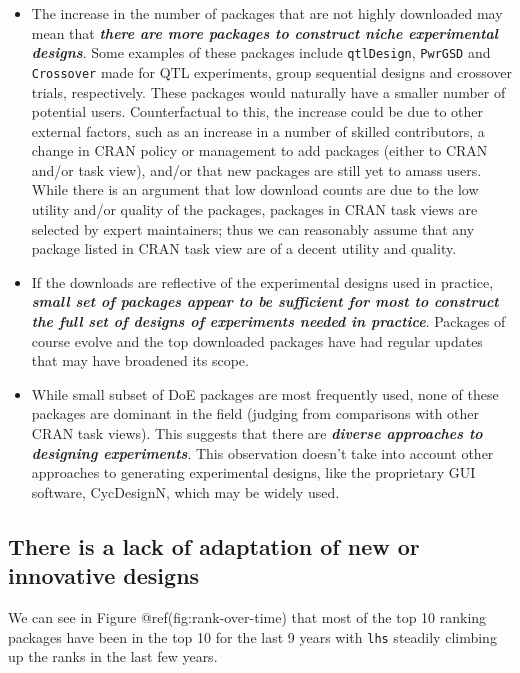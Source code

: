 \documentclass{article}
\providecommand{\tightlist}{%
  \setlength{\itemsep}{0pt}\setlength{\parskip}{0pt}}
\def\tightlist{}
\begin{document}
\begin{itemize}
\tightlist
\item
  The increase in the number of packages that are not highly downloaded
  may mean that \textbf{\emph{there are more packages to construct niche
  experimental designs}}. Some examples of these packages include
  \texttt{qtlDesign}, \texttt{PwrGSD} and \texttt{Crossover} made for
  QTL experiments, group sequential designs and crossover trials,
  respectively. These packages would naturally have a smaller number of
  potential users. Counterfactual to this, the increase could be due to
  other external factors, such as an increase in a number of skilled
  contributors, a change in CRAN policy or management to add packages
  (either to CRAN and/or task view), and/or that new packages are still
  yet to amass users. While there is an argument that low download
  counts are due to the low utility and/or quality of the packages,
  packages in CRAN task views are selected by expert maintainers; thus
  we can reasonably assume that any package listed in CRAN task view are
  of a decent utility and quality.
\item
  If the downloads are reflective of the experimental designs used in
  practice, \textbf{\emph{small set of packages appear to be sufficient
  for most to construct the full set of designs of experiments needed in
  practice}}. Packages of course evolve and the top downloaded packages
  have had regular updates that may have broadened its scope.
\item
  While small subset of DoE packages are most frequently used, none of
  these packages are dominant in the field (judging from comparisons
  with other CRAN task views). This suggests that there are
  \textbf{\emph{diverse approaches to designing experiments}}. This
  observation doesn't take into account other approaches to generating
  experimental designs, like the proprietary GUI software, CycDesignN,
  which may be widely used.
\end{itemize}

\hypertarget{ranking}{%
\subsection{There is a lack of adaptation of new or innovative
designs}\label{ranking}}

We can see in Figure @ref(fig:rank-over-time) that most of the top 10
ranking packages have been in the top 10 for the last 9 years with
\texttt{lhs} steadily climbing up the ranks in the last few years.
\end{document}
